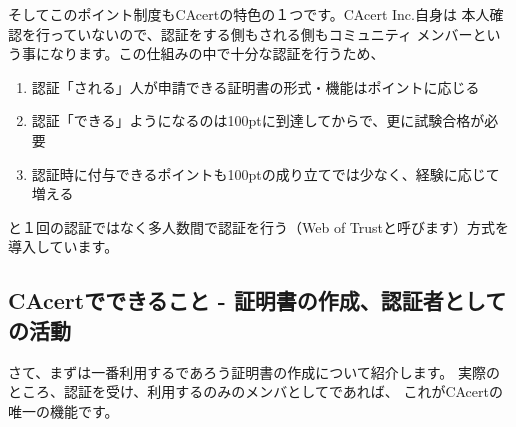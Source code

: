 \documentclass[mingoth,a4paper]{jsarticle}
\begin{document}
そしてこのポイント制度もCAcertの特色の１つです。CAcert Inc.自身は
本人確認を行っていないので、認証をする側もされる側もコミュニティ
メンバーという事になります。この仕組みの中で十分な認証を行うため、
\begin{enumerate}
\item 認証「される」人が申請できる証明書の形式・機能はポイントに応じる
\item 認証「できる」ようになるのは100ptに到達してからで、更に試験合格が必要
\item 認証時に付与できるポイントも100ptの成り立てでは少なく、経験に応じて増える
\end{enumerate}
と１回の認証ではなく多人数間で認証を行う（Web of Trustと呼びます）方式を
導入しています。

\subsection{CAcertでできること - 証明書の作成、認証者としての活動}

さて、まずは一番利用するであろう証明書の作成について紹介します。
実際のところ、認証を受け、利用するのみのメンバとしてであれば、
これがCAcertの唯一の機能です。
\end{document}
